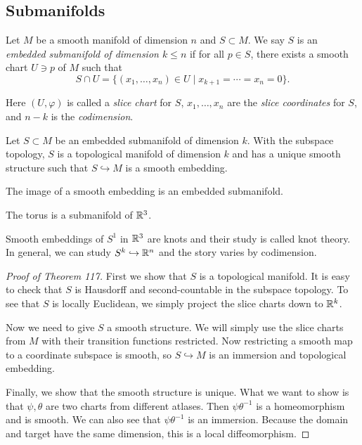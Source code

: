 \documentclass[twoside, 10pt]{article}
\begin{document}
    \subsection{Submanifolds}%
    \label{sub:submanifolds}
    
    \begin{defn}
        Let $M$ be a smooth manifold of dimension $n$ and $S \subset M$. We say $S$ is an \textit{embedded submanifold of dimension $k \leq n$} if for all $p \in S$, there exists a smooth chart $U \ni p$ of $M$ such that 
        \[S \cap U = \{(x_1, \ldots, x_n) \in U \mid x_{k+1} = \cdots = x_n = 0 \}.\]
    \end{defn}

    Here $(U, \varphi)$ is called a \textit{slice chart} for $S$, $x_1, \ldots, x_n$ are the \textit{slice coordinates} for $S$, and $n-k$ is the \textit{codimension}.

    \begin{thm}
        Let $S \subset M$ be an embedded submanifold of dimension $k$. With the subspace topology, $S$ is a topological manifold of dimension $k$ and has a unique smooth structure such that $S \hookrightarrow M$ is a smooth embedding.
    \end{thm}

    \begin{thm}
        The image of a smooth embedding is an embedded submanifold.
    \end{thm}

    \begin{exm}
        The torus is a submanifold of $\mathbb{R}^3$.
    \end{exm}

    \begin{exm}
        Smooth embeddings of $S^1$ in $\mathbb{R}^3$ are knots and their study is called knot theory. In general, we can study $S^k \hookrightarrow \mathbb{R}^n$ and the story varies by codimension.
    \end{exm}

    \begin{proof}[Proof of Theorem 117]
        First we show that $S$ is a topological manifold. It is easy to check that $S$ is Hausdorff and second-countable in the subspace topology. To see that $S$ is locally Euclidean, we simply project the slice charts down to $\mathbb{R}^k$.

        Now we need to give $S$ a smooth structure. We will simply use the slice charts from $M$ with their transition functions restricted. Now restricting a smooth map to a coordinate subspace is smooth, so $S \hookrightarrow M$ is an immersion and topological embedding.

        Finally, we show that the smooth structure is unique. What we want to show is that $\psi, \theta$ are two charts from different atlases. Then $\psi \theta^{-1}$ is a homeomorphism and is smooth. We can also see that $\psi \theta^{-1}$ is an immersion. Because the domain and target have the same dimension, this is a local diffeomorphism.
    \end{proof}
\end{document}
